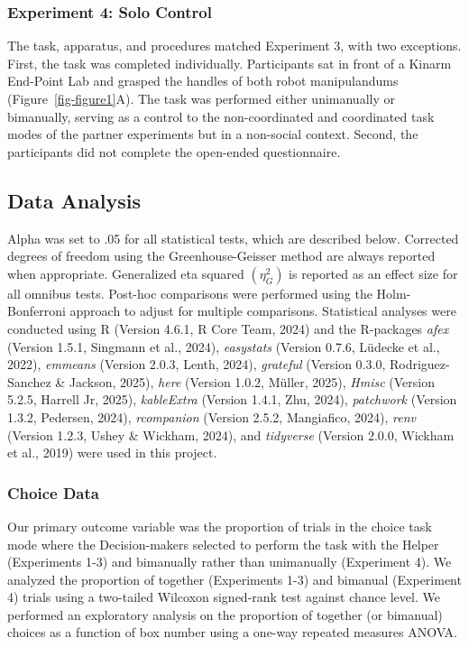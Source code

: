 \documentclass[
  11pt,
  letterpaper,
]{article}
\renewcommand{\emph}[1]{\textit{#1}}  %
\begin{document}
\subsubsection{Experiment 4: Solo
Control}\label{experiment-4-solo-control}

The task, apparatus, and procedures matched Experiment 3, with two
exceptions. First, the task was completed individually. Participants sat
in front of a Kinarm End-Point Lab and grasped the handles of both robot
manipulandums (Figure~\ref{fig-figure1}A). The task was performed either
unimanually or bimanually, serving as a control to the non-coordinated
and coordinated task modes of the partner experiments but in a
non-social context. Second, the participants did not complete the
open-ended questionnaire.

\subsection{Data Analysis}\label{data-analysis}

Alpha was set to .05 for all statistical tests, which are described
below. Corrected degrees of freedom using the Greenhouse-Geisser method
are always reported when appropriate. Generalized eta squared
\((\eta_{G}^{2})\) is reported as an effect size for all omnibus tests.
Post-hoc comparisons were performed using the Holm-Bonferroni approach
to adjust for multiple comparisons. Statistical analyses were conducted
using R (Version 4.6.1, R Core Team, 2024) and the R-packages
\emph{afex} (Version 1.5.1, Singmann et al., 2024), \emph{easystats}
(Version 0.7.6, Lüdecke et al., 2022), \emph{emmeans} (Version 2.0.3,
Lenth, 2024), \emph{grateful} (Version 0.3.0, Rodriguez-Sanchez \&
Jackson, 2025), \emph{here} (Version 1.0.2, Müller, 2025), \emph{Hmisc}
(Version 5.2.5, Harrell Jr, 2025), \emph{kableExtra} (Version 1.4.1,
Zhu, 2024), \emph{patchwork} (Version 1.3.2, Pedersen, 2024),
\emph{rcompanion} (Version 2.5.2, Mangiafico, 2024), \emph{renv}
(Version 1.2.3, Ushey \& Wickham, 2024), and \emph{tidyverse} (Version
2.0.0, Wickham et al., 2019) were used in this project.

\subsubsection{Choice Data}\label{choice-data}

Our primary outcome variable was the proportion of trials in the choice
task mode where the Decision-makers selected to perform the task with
the Helper (Experiments 1-3) and bimanually rather than unimanually
(Experiment 4). We analyzed the proportion of together (Experiments 1-3)
and bimanual (Experiment 4) trials using a two-tailed Wilcoxon
signed-rank test against chance level. We performed an exploratory
analysis on the proportion of together (or bimanual) choices as a
function of box number using a one-way repeated measures ANOVA.
\end{document}
